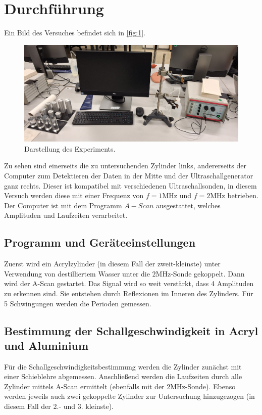 \section{Durchführung}
\label{sec:Durchführung}

Ein Bild des Versuches befindet sich in \autoref{fig:1}.
\begin{figure}[H]
    \centering
        \centering
        \includegraphics[width=\textwidth]{bilder/versuch.jpg}
        \caption{Darstellung des Experiments.}
    \hfill
    \label{fig:1}
\end{figure}
\noindent Zu sehen sind einerseits die zu untersuchenden Zylinder links, andererseits 
der Computer zum Detektieren der Daten in der Mitte und der Ultraschallgenerator 
ganz rechts. Dieser ist kompatibel mit verschiedenen Ultraschallsonden, in diesem 
Versuch werden diese mit einer Frequenz von $f = 1 \unit{\mega\hertz}$ und 
$f = 2 \unit{\mega\hertz}$ betrieben. Der Computer ist mit dem Programm $A-Scan$ 
ausgestattet, welches Amplituden und Laufzeiten verarbeitet.

\subsection{Programm und Geräteeinstellungen}
Zuerst wird ein Acrylzylinder (in diesem Fall der zweit-kleinste) unter Verwendung 
von destilliertem Wasser unter die $2 \unit{\mega\hertz}$-Sonde gekoppelt. 
Dann wird der A-Scan gestartet. Das Signal wird so weit verstärkt, dass 4 
Amplituden zu erkennen sind. Sie entstehen durch Reflexionen im Inneren des 
Zylinders. Für 5 Schwingungen werden die Perioden gemessen.

\subsection{Bestimmung der Schallgeschwindigkeit in Acryl und Aluminium}
Für die Schallgeschwindigkeitsbestimmung werden die Zylinder zunächst mit einer 
Schieblehre abgemessen. Anschließend werden die Laufzeiten durch alle Zylinder 
mittels A-Scan ermittelt (ebenfalls mit der $2 \unit{\mega\hertz}$-Sonde). 
Ebenso werden jeweils auch zwei gekoppelte Zylinder zur Untersuchung hinzugezogen
(in diesem Fall der 2.- und 3. kleinste).

